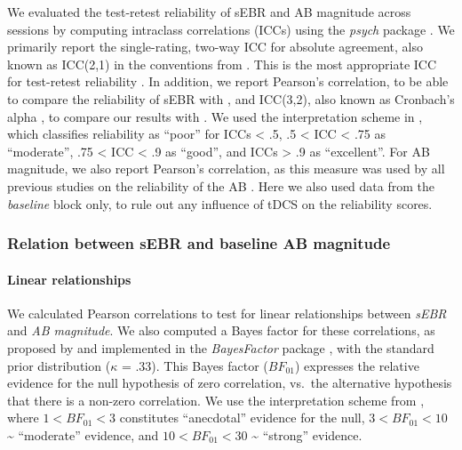 \documentclass[11pt,]{memoir}
\let\oldparagraph\paragraph
\renewcommand{\paragraph}[1]{\oldparagraph{#1}\mbox{}}
\begin{document}
We evaluated the test-retest reliability of sEBR and AB magnitude across sessions by computing intraclass correlations (ICCs) using the \emph{psych} package \autocite[Version 1.8.10;][]{R-psych}. We primarily report the single-rating, two-way ICC for absolute agreement, also known as ICC(2,1) in the conventions from \textcite{Shrout1979}. This is the most appropriate ICC for test-retest reliability \autocite{Koo2016}. In addition, we report Pearson's correlation, to be able to compare the reliability of sEBR with \textcite{Dang2017}, and ICC(3,2), also known as Cronbach's alpha \autocite{McGraw1996}, to compare our results with \textcite{Kruis2016}. We used the interpretation scheme in \textcite{Koo2016}, which classifies reliability as ``poor'' for ICCs \textless{} .5, .5 \textless{} ICC \textless{} .75 as ``moderate'', .75 \textless{} ICC \textless{} .9 as ``good'', and ICCs \textgreater{} .9 as ``excellent''. For AB magnitude, we also report Pearson's correlation, as this measure was used by all previous studies on the reliability of the AB \autocite[e.g.][]{Dale2013}. Here we also used data from the \emph{baseline} block only, to rule out any influence of tDCS on the reliability scores.

\hypertarget{AB_sEBR-methods-base}{%
\subsubsection{Relation between sEBR and baseline AB magnitude}\label{AB_sEBR-methods-base}}

\hypertarget{linear-relationships}{%
\paragraph{Linear relationships}\label{linear-relationships}}

We calculated Pearson correlations to test for linear relationships between \emph{sEBR} and \emph{AB magnitude}. We also computed a Bayes factor for these correlations, as proposed by \textcite{Ly2016} and implemented in the \emph{BayesFactor} package \autocite[Version 0.9.12-4.2;][]{R-BayesFactor}, with the standard prior distribution (\(\kappa\) = .33). This Bayes factor (\(BF_{01}\)) expresses the relative evidence for the null hypothesis of zero correlation, vs.~the alternative hypothesis that there is a non-zero correlation. We use the interpretation scheme from \textcite{Wagenmakers2018}, where \(1 < BF_{01} < 3\) constitutes ``anecdotal'' evidence for the null, \(3 < BF_{01} < 10\) \textasciitilde{} ``moderate'' evidence, and \(10 < BF_{01} < 30\) \textasciitilde{} ``strong'' evidence.
\end{document}
